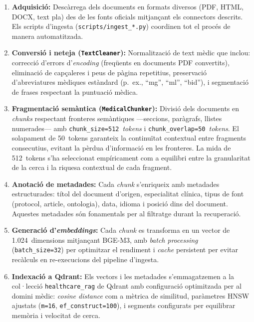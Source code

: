 \documentclass[CAT]{TFUOC}%
\begin{document}
\begin{enumerate}
    \item \textbf{Adquisició:} Descàrrega dels documents en formats diversos (PDF, HTML, DOCX, text pla) des de les fonts oficials mitjançant els connectors descrits. Els scripts d'ingesta (\texttt{scripts/ingest\_*.py}) coordinen tot el procés de manera automatitzada.

    \item \textbf{Conversió i neteja (\texttt{TextCleaner}):} Normalització de text mèdic que inclou: correcció d'errors d'\textit{encoding} (freqüents en documents PDF convertits), eliminació de capçaleres i peus de pàgina repetitius, preservació d'abreviatures mèdiques estàndard (p.~ex., ``mg'', ``ml'', ``bid''), i segmentació de frases respectant la puntuació mèdica.

    \item \textbf{Fragmentació semàntica (\texttt{MedicalChunker}):} Divisió dels documents en \textit{chunks} respectant fronteres semàntiques ---seccions, paràgrafs, llistes numerades--- amb \texttt{chunk\_size=512}~\textit{tokens} i \texttt{chunk\_overlap=50}~\textit{tokens}. El solapament de 50~tokens garanteix la continuïtat contextual entre fragments consecutius, evitant la pèrdua d'informació en les fronteres. La mida de 512~tokens s'ha seleccionat empíricament com a equilibri entre la granularitat de la cerca i la riquesa contextual de cada fragment.

    \item \textbf{Anotació de metadades:} Cada \textit{chunk} s'enriqueix amb metadades estructurades: títol del document d'origen, especialitat clínica, tipus de font (protocol, article, ontologia), data, idioma i posició dins del document. Aquestes metadades són fonamentals per al filtratge durant la recuperació.

    \item \textbf{Generació d'\textit{embeddings}:} Cada \textit{chunk} es transforma en un vector de 1.024~dimensions mitjançant BGE-M3, amb \textit{batch processing} (\texttt{batch\_size=32}) per optimitzar el rendiment i \textit{cache} persistent per evitar recàlculs en re-execucions del pipeline d'ingesta.

    \item \textbf{Indexació a Qdrant:} Els vectors i les metadades s'emmagatzemen a la col·lecció \texttt{healthcare\_rag} de Qdrant amb configuració optimitzada per al domini mèdic: \textit{cosine distance} com a mètrica de similitud, paràmetres HNSW ajustats (\texttt{m=16}, \texttt{ef\_construct=100}), i segments configurats per equilibrar memòria i velocitat de cerca.
\end{enumerate}
\end{document}
